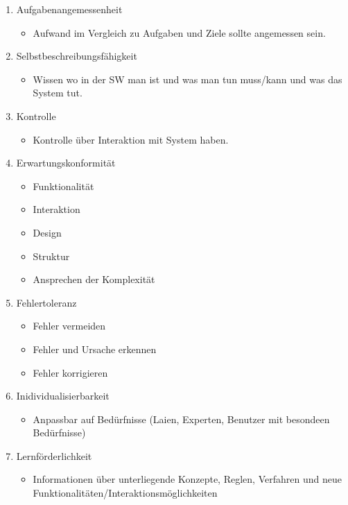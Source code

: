 \documentclass{article}
\begin{document}
\begin{enumerate}
	\item Aufgabenangemessenheit
	\begin{itemize}
		\item Aufwand im Vergleich zu Aufgaben und Ziele sollte angemessen sein.
	\end{itemize}
	\item Selbstbeschreibungsfähigkeit
		\begin{itemize}
		\item Wissen wo in der SW man ist und was man tun muss/kann und was das System tut.
	\end{itemize}
	\item Kontrolle
		\begin{itemize}
		\item Kontrolle über Interaktion mit System haben.
	\end{itemize}
	\item Erwartungskonformität
		\begin{itemize}
		\item Funktionalität
		\item Interaktion
		\item Design
		\item Struktur
		\item Ansprechen der Komplexität
	\end{itemize}
	\item Fehlertoleranz
		\begin{itemize}
		\item Fehler vermeiden
		\item Fehler und Ursache erkennen
		\item Fehler korrigieren
	\end{itemize}
	\item Inidividualisierbarkeit
		\begin{itemize}
		\item Anpassbar auf Bedürfnisse (Laien, Experten, Benutzer mit besondeen Bedürfnisse)
	\end{itemize}
	\item Lernförderlichkeit
		\begin{itemize}
		\item Informationen über unterliegende Konzepte, Reglen, Verfahren und neue Funktionalitäten/Interaktionsmöglichkeiten
	\end{itemize}
\end{enumerate}
\end{document}
